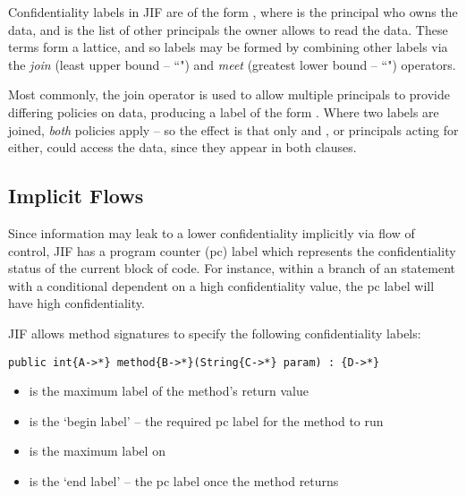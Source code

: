 Confidentiality labels in JIF are of the form , where  is the principal who owns the data, and  is the list of other principals the owner allows to read the data. These terms form a lattice, and so labels may be formed by combining other labels via the \textit{join} (least upper bound -- ``\mono{;}") and \textit{meet} (greatest lower bound -- ``") operators.

Most commonly, the join operator is used to allow multiple principals to provide differing policies on data, producing a label of the form . Where two labels are joined, \textit{both} policies apply -- so the effect is that only  and , or principals acting for either, could access the data, since they appear in both clauses.

\subsection{Implicit Flows}

Since information may leak to a lower confidentiality implicitly via flow of control, JIF has a program counter (pc) label which represents the confidentiality status of the current block of code. For instance, within a branch of an  statement with a conditional dependent on a high confidentiality value, the pc label will have high confidentiality.

JIF allows method signatures to specify the following confidentiality labels:

\begin{verbatim}
public int{A->*} method{B->*}(String{C->*} param) : {D->*}
\end{verbatim}

\begin{itemize}
	\item {} is the maximum label of the method's return value
	
	\item {} is the `begin label' -- the required pc label for the method to run
	
	\item {} is the maximum label on 
	
	\item {} is the `end label' -- the pc label once the method returns
\end{itemize}

\newpage


